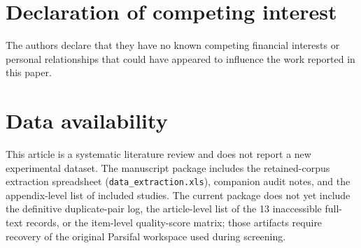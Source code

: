 \documentclass[preprint,12pt,number,longtitle]{elsarticle}
\begin{document}
\section*{Declaration of competing interest}

The authors declare that they have no known competing financial interests or personal relationships that could have appeared to influence the work reported in this paper.

\section*{Data availability}

This article is a systematic literature review and does not report a new experimental dataset. The manuscript package includes the retained-corpus extraction spreadsheet (\texttt{data\_extraction.xls}), companion audit notes, and the appendix-level list of included studies. The current package does not yet include the definitive duplicate-pair log, the article-level list of the 13 inaccessible full-text records, or the item-level quality-score matrix; those artifacts require recovery of the original Parsifal workspace used during screening.



\end{document}
